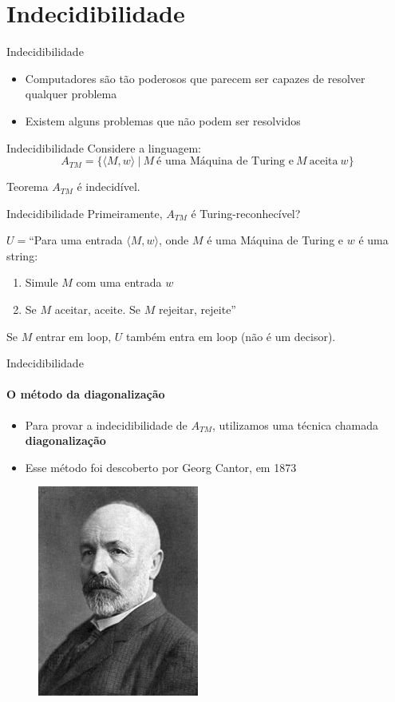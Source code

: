 \documentclass{beamer}
\begin{document}
\section{Indecidibilidade}
\begin{frame}{Indecidibilidade}
	\begin{itemize}
		\item Computadores são tão poderosos que parecem ser capazes de resolver qualquer problema
		\item Existem alguns problemas que não podem ser resolvidos
	\end{itemize}
\end{frame}
\begin{frame}{Indecidibilidade}
	Considere a linguagem:
	\begin{equation*}
		A_{TM} = \{\langle M,w\rangle\ |\ M\ \text{é uma Máquina de Turing e}\ M\ \text{aceita}\ w\}
	\end{equation*}\pause
	\begin{block}{Teorema}
		$A_{TM}$ é indecidível.
	\end{block}
\end{frame}
\begin{frame}{Indecidibilidade}
	Primeiramente, $A_{TM}$ é Turing-reconhecível?\pause
	
	$U = $``Para uma entrada $\langle M,w\rangle$, onde $M$ é uma Máquina de Turing e $w$ é uma string:
	\begin{enumerate}
		\item Simule $M$ com uma entrada $w$
		\item Se $M$ aceitar, aceite. Se $M$ rejeitar, rejeite''
	\end{enumerate}
	
	Se $M$ entrar em loop, $U$ também entra em loop (não é um decisor).
\end{frame}
\begin{frame}{Indecidibilidade}
	\framesubtitle{O método da diagonalização}
	\begin{itemize}
		\item Para provar a indecidibilidade de $A_{TM}$, utilizamos uma técnica chamada \textbf{diagonalização}
		\item Esse método foi descoberto por Georg Cantor, em 1873
	\end{itemize}
	\begin{figure}
		\includegraphics[width=0.3\paperwidth]{resources/cantor}
	\end{figure}
\end{frame}
\end{document}
